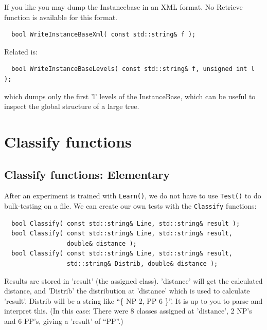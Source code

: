\documentclass{report}
\begin{document}
If you like you may dump the Instancebase in an XML format. No Retrieve
function is available for this format.

\begin{footnotesize}
\begin{verbatim}
  bool WriteInstanceBaseXml( const std::string& f );
\end{verbatim}
\end{footnotesize}

Related is:

\begin{footnotesize}
\begin{verbatim}
  bool WriteInstanceBaseLevels( const std::string& f, unsigned int l );
\end{verbatim}
\end{footnotesize}

which dumps only the first 'l' levels of the InstanceBase, which can
be useful to inspect the global structure of a large tree.

\chapter{Classify functions}

\section{Classify functions: Elementary}
After an experiment is trained with {\tt Learn()}, we do not have to use
{\tt Test()} to do bulk-testing on a file.
We can create our own tests with the {\tt Classify} functions:

\begin{footnotesize}
\begin{verbatim}
  bool Classify( const std::string& Line, std::string& result );
  bool Classify( const std::string& Line, std::string& result,
                 double& distance );
  bool Classify( const std::string& Line, std::string& result,
                 std::string& Distrib, double& distance );
\end{verbatim}
\end{footnotesize}

Results are stored in 'result' (the assigned class). 'distance' will
get the calculated distance, and 'Distrib' the distribution at
'distance' which is used to calculate 'result'.  Distrib will be a
string like ``\{ NP 2, PP 6 \}''. It is up to you to parse and
interpret this. (In this case: There were 8 classes assigned at
'distance', 2 NP's and 6 PP's, giving a 'result' of ``PP''.)
\end{document}
